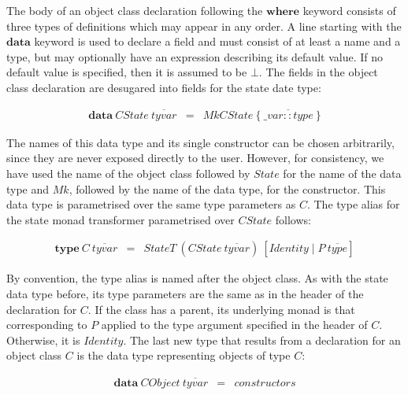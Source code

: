 \documentclass[runningheads,a4paper]{llncs}
\begin{document}
The body of an object class declaration following the $\mathbf{where}$ keyword consists of three types of definitions which may appear in any order. A line starting with the $\mathbf{data}$ keyword is used to declare a field and must consist of at least a name and a type, but may optionally have an expression describing its default value. If no default value is specified, then it is assumed to be $\bot$. The fields in the object class declaration are desugared into fields for the state date type: 

\begin{displaymath}
\begin{array}{lcl}
\mathbf{data}~\mathit{CState}~\overline{\mathit{tyvar}} & = & \mathit{MkCState}~\{~\overline{\_\mathit{var} :: \mathit{type}}~\}
\end{array}
\end{displaymath}

The names of this data type and its single constructor can be chosen arbitrarily, since they are never exposed directly to the user. However, for consistency, we have used the name of the object class followed by $\mathit{State}$ for the name of the data type and $\mathit{Mk}$, followed by the name of the data type, for the constructor. This data type is parametrised over the same type parameters as $C$. The type alias for the state monad transformer parametrised over $\mathit{CState}$ follows:

\begin{displaymath}
\begin{array}{lcl}
\mathbf{type}~\mathit{C}~\overline{\mathit{tyvar}} & = & \mathit{StateT}~(\mathit{CState}~\overline{\mathit{tyvar}})~[\mathit{Identity} \mid P~\overline{\mathit{type}}]
\end{array}
\end{displaymath}

By convention, the type alias is named after the object class. As with the state data type before, its type parameters are the same as in the header of the declaration for $C$. If the class has a parent, its underlying monad is that corresponding to $P$ applied to the type argument specified in the header of $C$. Otherwise, it is $\mathit{Identity}$. The last new type that results from a declaration for an object class $C$ is the data type representing objects of type $C$:

\begin{displaymath}
\begin{array}{lcl}
\mathbf{data}~\mathit{CObject}~\overline{\mathit{tyvar}} & = & \mathit{constructors}
\end{array}
\end{displaymath}
\end{document}
